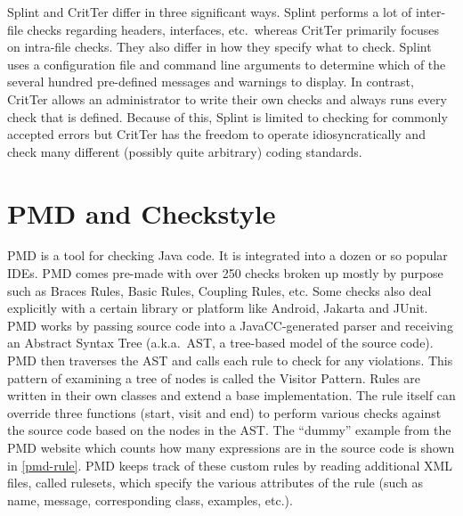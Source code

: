 \documentclass[12pt]{report}
\newcommand{\programName}{CritTer\xspace}
\begin{document}
Splint and \programName differ in three significant ways. Splint performs a lot of inter-file checks 
regarding headers, interfaces, etc.\ whereas \programName primarily focuses on intra-file checks. 
They also differ in how they specify what to check. Splint uses a configuration file and command line 
arguments to determine which of the several hundred pre-defined messages and warnings to display. In 
contrast, \programName allows an administrator to write their own checks and always runs every check 
that is defined. Because of this, Splint is limited to checking for commonly accepted errors but 
\programName has the freedom to operate idiosyncratically and check many different (possibly quite 
arbitrary) coding standards. 

\section{PMD and Checkstyle}
\label{sec:pmdAndCheckstyle}

PMD is a tool for checking Java code. It is integrated into a dozen or so popular IDEs.
PMD comes pre-made with over 250 checks broken up mostly by purpose such as Braces Rules, 
Basic Rules, Coupling Rules, etc. Some checks also deal explicitly with a certain 
library or platform like Android, Jakarta and JUnit. PMD works by passing source code into a 
JavaCC-generated parser and receiving an Abstract Syntax Tree (a.k.a.\ AST, a tree-based model of 
the source code). PMD then traverses the AST and calls each rule to check for any
violations. This pattern of examining a tree of nodes is called the Visitor Pattern\cite{design-patterns}. 
Rules are written in their own classes and extend a base implementation. The rule itself can 
override three functions (start, visit and end) to perform various checks against the source code based 
on the nodes in the AST. The ``dummy'' example from the PMD website which counts how 
many expressions are in the source code is shown in \autoref{pmd-rule}. PMD keeps track of these 
custom rules by reading additional XML files, called rulesets, which specify the various attributes of the 
rule (such as name, message, corresponding class, examples, etc.).
\end{document}
